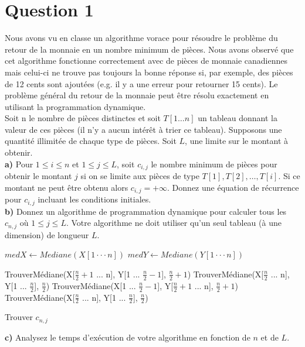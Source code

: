 \documentclass[devoir3.tex]{subfiles}
\begin{document}
\section*{Question 1}
Nous avons vu en classe un algorithme vorace pour résoudre le problème du retour de la monnaie en un nombre minimum de pièces. Nous avons observé que cet algorithme fonctionne correctement avec de pièces de monnaie canadiennes mais celui-ci ne trouve pas toujours la bonne réponse si, par exemple, des pièces de 12 cents sont ajoutées (e.g. il y a une erreur pour retourner 15 cents). Le problème général du retour de la monnaie peut être résolu exactement en utilisant la programmation dynamique. \\[0.2cm]
Soit n le nombre de pièces distinctes et soit \(T[1 \dots n]\) un tableau donnant la valeur de ces pièces (il n’y a aucun intérêt à trier ce tableau). Supposons une quantité illimitée de chaque type de pièces. Soit \(L\), une limite sur le montant à obtenir. \\

\textbf{a)} Pour \(1 \leq i \leq n\) et \(1 \leq j \leq L\), soit \(c_{i,j}\) le nombre minimum de pièces pour obtenir le montant \(j\) si on se limite aux pièces de type \(T[1], T[2], \dots , T[i]\). Si ce montant ne peut être obtenu alors \(c_{i,j} = +\infty \). Donnez une équation de récurrence pour \(c_{i,j}\) incluant les conditions initiales. \\

\textbf{b)} Donnez un algorithme de programmation dynamique pour calculer tous les \(c_{n,j}\) où \(1 \leq j \leq L\). Votre algorithme ne doit utiliser qu’un seul tableau (à une dimension) de longueur \(L\). \\

\begin{algorithm}[H]


      	\(medX \gets Mediane(X[1 \cdot\cdot\cdot  n]) \) \;
      	\(medY \gets Mediane(Y[1 \cdot\cdot\cdot  n]) \) \;


      	{
      		{
      			\Return TrouverMédiane(X[\( \frac{n}{2} +1\) ...  n], Y[1 ...  \( \frac{n}{2} -1\)], \( \frac{n}{2} +1\))
      		}
      		{
      			\Return TrouverMédiane(X[\( \frac{n}{2}\) ...  n], Y[1 ...  \( \frac{n}{2}\)], \( \frac{n}{2}\))
      		}
      	}
      	{
      		{
      			\Return TrouverMédiane(X[1 ...  \( \frac{n}{2} -1\)], Y[\( \frac{n}{2} +1\) ...  n], \( \frac{n}{2} +1\))
      		}
      		{
      			\Return TrouverMédiane(X[\( \frac{n}{2}\) ...  n], Y[1 ...  \( \frac{n}{2}\)], \( \frac{n}{2}\))
      		}
      	}


      \caption{Trouver \(c_{n,j}\)}
\end{algorithm}

\textbf{c)} Analysez le temps d’exécution de votre algorithme en fonction de \(n\)
et de \(L\).
\end{document}
